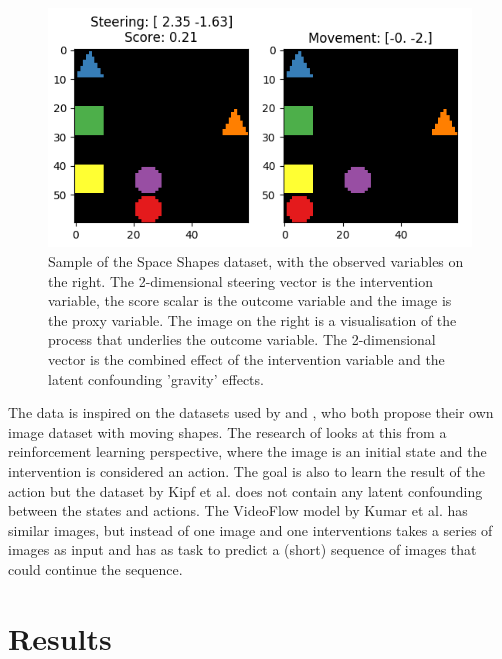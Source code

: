 \documentclass{report}
\begin{document}
\begin{figure}
    \centering
    \includegraphics{latex/Images/sample_space_shapes_score_left.png}
    \caption{Sample of the Space Shapes dataset, with the observed variables on the right. The 2-dimensional steering vector is the intervention variable, the score scalar is the outcome variable and the image is the proxy variable. The image on the right is a visualisation of the process that underlies the outcome variable. The 2-dimensional vector is the combined effect of the intervention variable and the latent confounding 
   'gravity' effects.}
    \label{fig:space_shapes_sample}
\end{figure}

The data is inspired on the datasets used by \cite{kipf2019contrastive} and \cite{kumar2019videoflow}, who both propose their own image dataset with moving shapes. The research of \cite{kipf2019contrastive} looks at this from a reinforcement learning perspective, where the image is an initial state and the intervention is considered an action. The goal is also to learn the result of the action but the dataset by Kipf et al. does not contain any latent confounding between the states and actions. The VideoFlow model by Kumar et al. has similar images, but instead of one image and one interventions takes a series of images as input and has as task to predict a (short) sequence of images that could continue the sequence.


\chapter{Results}
\end{document}
